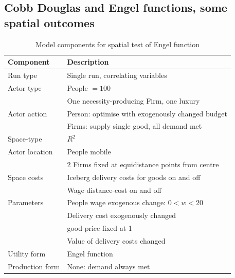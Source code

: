 \subsection{Cobb Douglas and Engel functions, some spatial outcomes \label{sec:engelspace}}

%
\renewcommand{\arraystretch}{1.2}
\begin{table}[!hbt]
\begin{center}

\begin{tabular}{|l|l|}
\hline 
\textbf{Component} & \textbf{Description}\\
\hline
Run type & Single run, correlating variables\\
\hline
Actor type & People $ = 100$ \\
& One necessity-producing Firm, one luxury\\
\hline
Actor action & Person: optimise with exogenously changed budget\\
& Firms: supply single good, all demand met\\
\hline
Space-type & $R^2$\\
\hline
Actor location & People mobile\\ 
& 2 Firms fixed at equidistance points from centre\\
\hline
Space costs & Iceberg delivery costs for goods on and off\\
& Wage distance-cost on and off\\
\hline
Parameters & People wage exogenous change: $0<w<20$\\
& Delivery cost exogenously changed\\
& good price fixed at 1\\
& Value of delivery costs changed\\
\hline
Utility form & Engel function\\
\hline
Production form & None: demand always met\\
\hline

\end{tabular}

\caption{Model components for spatial test of Engel function \label{tab:engeltest1}}
\end{center}
\end{table}


